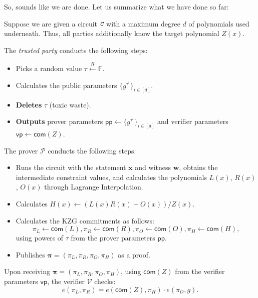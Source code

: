 \documentclass[../lecture-notes.tex]{subfiles}
\begin{document}
So, sounds like we are done. Let us summarize what we have done so far:
\begin{tcolorbox}[title=Attempt \#1: Non-sound SNARK Protocol,
    colback=blue!5!white,
    colframe=blue!75!black,
    colbacktitle=blue!25!white,
    coltitle=blue!20!black,
    fonttitle=\bfseries,
    boxrule=1.25pt,
    subtitle style={boxrule=0pt,
    colback=blue!20!white,
    colupper=blue!75!gray} ]

    Suppose we are given a circuit $\textit{\texttt{C}}$ with a maximum degree $d$ of polynomials used underneath. Thus, all parties additionally know the target polynomial $Z(x)$.

    The \emph{trusted party} conducts the following steps:
    \begin{itemize}[label=]
        \item Picks a random value $\tau \xleftarrow{R} \mathbb{F}$.
        \item Calculates the public parameters $\{g^{\tau^i}\}_{i \in [d]}$.
        \item \textbf{Deletes} $\tau$ (toxic waste).
        \item \textbf{Outputs} prover parameters $\mathsf{pp} \gets \{g^{\tau^i}\}_{i \in [d]}$ and verifier parameters $\mathsf{vp} \gets \mathsf{com}(Z)$.
    \end{itemize}
    The prover $\mathcal{P}$ conducts the following steps:
    \begin{itemize}[label=]
        \item Runs the circuit with the statement $\mathbf{x}$ and witness $\mathbf{w}$, obtains the intermediate constraint values, and calculates the polynomials $L(x)$, $R(x)$, $O(x)$ through Lagrange Interpolation.
        \item Calculates $H(x) \gets (L(x)R(x) - O(x))\big/ Z(x)$.
        \item Calculates the KZG commitments as follows: 
        \begin{equation*}
            \pi_L \gets \mathsf{com}(L), \pi_R \gets \mathsf{com}(R), \pi_O \gets \mathsf{com}(O), \pi_H \gets \mathsf{com}(H),
        \end{equation*}
        using powers of $\tau$ from the prover parameters $\mathsf{pp}$.
        \item Publishes $\boldsymbol{\pi} = (\pi_L,\pi_R,\pi_O,\pi_H)$ as a proof.
    \end{itemize}
    Upon receiving $\boldsymbol{\pi} = (\pi_L,\pi_R,\pi_O,\pi_H)$, using $\mathsf{com}(Z)$ from the verifier parameters $\mathsf{vp}$, the verifier $\mathcal{V}$ checks:
    \begin{equation*}
        e(\pi_L, \pi_R) = e(\mathsf{com}(Z), \pi_H) \cdot e(\pi_O, g).
    \end{equation*}
\end{tcolorbox}
\end{document}
